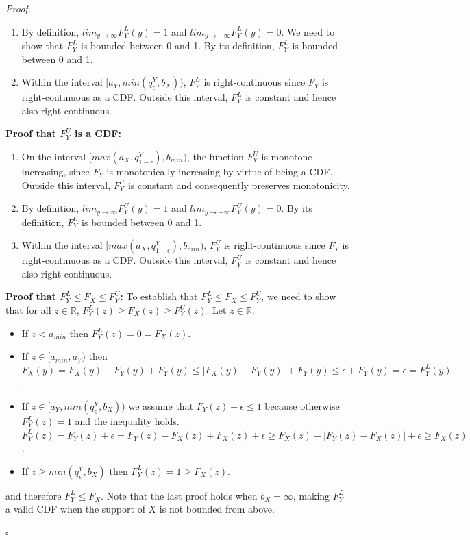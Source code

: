 \documentclass[letterpaper]{article} %
\newenvironment{proof}{\noindent\textit{Proof.}}{\hfill$\square$}
\begin{document}
\begin{proof}
\begin{enumerate}
		\item By definition, $lim_{y\rightarrow \infty}F_Y^L(y)=1$ and $lim_{y\rightarrow -\infty}F_Y^L(y)=0$. We need to show that $F_Y^L$ is bounded between 0 and 1. By its definition, $F_Y^L$ is bounded between 0 and 1.
		
		\item Within the interval $[a_Y, min(q_{\epsilon}^Y, b_X))$, $F_Y^L$ is right-continuous since $F_Y$ is right-continuous as a CDF. Outside this interval, $F_Y^L$ is constant and hence also right-continuous.
	\end{enumerate}
	\textbf{Proof that $F_Y^U$ is a CDF:} \begin{enumerate}
		\item On the interval $[max(a_X,q_{1-\epsilon}^Y), b_{min})$, the function $F_Y^U$ is monotone increasing, since $F_Y$ is monotonically increasing by virtue of being a CDF. Outside this interval, $F_Y^U$ is constant and consequently preserves monotonicity.
		\item By definition, $lim_{y\rightarrow \infty}F_Y^U(y)=1$ and $lim_{y\rightarrow -\infty}F_Y^U(y)=0$. By its definition, $F_Y^U$ is bounded between 0 and 1.
		\item Within the interval $[max(a_X,q_{1-\epsilon}^Y), b_{min})$, $F_Y^U$ is right-continuous since $F_Y$ is right-continuous as a CDF. Outside this interval, $F_Y^U$ is constant and hence also right-continuous.
	\end{enumerate}
	\textbf{Proof that $F_Y^L \leq F_X \leq F_Y^U$:} To establish that $F_Y^L \leq F_X \leq F_Y^U$, we need to show that for all $z \in \mathbb{R}$, $F_Y^L(z) \geq F_X(z) \geq F_Y^U(z)$. Let $z\in \mathbb{R}$. \begin{itemize}
		\item If $z<a_{min}$ then $F_Y^L(z)=0 = F_X(z)$.
		\item If $z\in [a_{min}, a_Y)$ then $F_X(y)=F_X(y)-F_Y(y)+F_Y(y)\leq |F_X(y)-F_Y(y)| + F_Y(y)\leq \epsilon + F_Y(y)=\epsilon=F_Y^L(y)$.
		\item If $z\in [a_Y, min(q_\epsilon^Y, b_X))$ we assume that $F_Y(z)+\epsilon\leq 1$ because otherwise $F_Y^L(z)=1$ and the inequality holds. $F_Y^L(z)=F_Y(z) + \epsilon = F_Y(z)-F_X(z)+F_X(z)+\epsilon \geq F_X(z) - |F_Y(z)-F_X(z)| + \epsilon\geq F_X(z)$.
		\item If $z\geq min(q_\epsilon^Y, b_X)$ then $F_Y^L(z)=1\geq F_X(z)$.
	\end{itemize} 
	and therefore $F_Y^L\leq F_X$. Note that the last proof holds when $b_X=\infty$, making $F_Y^L$ a valid CDF when the support of $X$ is not bounded from above.

\end{proof}
\end{document}
